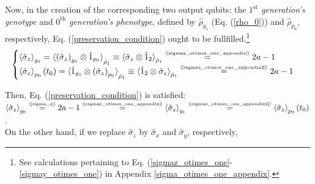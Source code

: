 \documentclass[11pt]{article}
\numberwithin{equation}{section} %
\numberwithin{figure}{section} %
\newcommand\numeq[1] %
  {\stackrel{\scriptscriptstyle(\mkern-1.5mu#1\mkern-1.5mu)}{=}}
\begin{document}
Now, in the creation of the corresponding two output qubits: the \emph{$1^\textrm{st}$ generation's genotype} and \emph{$0^\textrm{th}$ generation's phenotype},  defined by $\hat{\rho}_{g_1}$ (Eq. (\ref{rho_0})) and $\hat{\rho}_{p_0}$, respectively, Eq. (\ref{preservation_condition}) ought to be fullfilled.\footnote{See calculations pertaining to Eq. (\ref{sigmaz_otimes_one}-\ref{sigmay_otimes_one}) in Appendix \ref{sigma_otimes_one_appendix}.} $\,\,$ \cite[p.~2, Eq.~(1)]{Ferraro}
\begin{equation} \label{sigmaz_otimes_one}
\begin{cases}
 \braket{\hat{\sigma}_z}_{g_1}= \braket{ \left(\hat{\sigma}_z\right)_{g_1}\otimes \hat{1}_{p_0}}_{\hat{\rho}_1} \equiv\braket{\hat{\sigma}_z\otimes\hat{1}_2}_{\hat{\rho}_1}
 \numeq{\textrm{\ref{sigmaz_otimes_one_appendix}}}2a-1\\
 \braket{\hat{\sigma}_z}_{p_0}(t_0)= \braket{\hat{1}_{g_1}\otimes\left(\hat{\sigma}_z\right)_{p_0}}_{\hat{\rho}_1} \equiv\braket{\hat{1}_2\otimes\hat{\sigma}_z}_{\hat{\rho}_1}
 \numeq{\textrm{\ref{sigmaz_otimes_one_appendix2}}}2a-1
\end{cases}
\end{equation}

Then, Eq. (\ref{preservation_condition}) is satisfied: $\braket{\hat{\sigma}_z}_{g_0} \numeq{\textrm{\ref{sigma_z}}} 2a-1  \numeq{\textrm{\ref{sigmaz_otimes_one_appendix}}} \braket{\hat{\sigma}_z}_{g_1} \numeq{\textrm{\ref{sigmaz_otimes_one_appendix2}}}\braket{\hat{\sigma}_z}_{p_0}(t_0)$.\\

On the other hand, if we replace $\hat{\sigma}_z$ by $\hat{\sigma}_x$ and $\hat{\sigma}_y$, respectively, 
\end{document}
